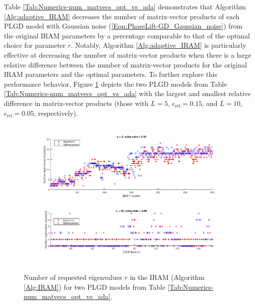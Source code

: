 Table \ref{Tab:Numerics-num_matvecs_opt_vs_ada} demonstrates that Algorithm \ref{Alg:adaptive_IRAM} decreases the number of matrix-vector products of each PLGD model with Gaussian noise (\ref{Eqn:PhaseLift-GD_Gaussian_noise}) from the original IRAM parameters by a percentage comparable to that of the optimal choice for parameter $r$.
Notably, Algorithm \ref{Alg:adaptive_IRAM} is particularly effective at decreasing the number of matrix-vector products when there is a large relative difference between the number of matrix-vector products for the original IRAM parameters and the optimal parameters.
To further explore this performance behavior, Figure \ref{Fig:Numerics-num_eigs_ada_vs_opt} depicts the two PLGD models from Table \ref{Tab:Numerics-num_matvecs_opt_vs_ada} with the largest and smallest relative difference in matrix-vector products (those with $L=5$, $\epsilon_\text{rel} = 0.15$, and $L=10$, $\epsilon_\text{rel} = 0.05$, respectively).



\begin{figure}[H]
\centering
\hbox{\hspace{-1.0cm} \includegraphics[scale=0.6]{Numerics-num_eigs_ada_vs_opt_1} }\vspace{0.6cm}
\hbox{\hspace{-1.0cm} \includegraphics[scale=0.6]{Numerics-num_eigs_ada_vs_opt_2} }
\vspace{0.2cm}
	\caption{
	Number of requested eigenvalues $r$ in the IRAM (Algorithm \ref{Alg:IRAM}) for two PLGD models from Table \ref{Tab:Numerics-num_matvecs_opt_vs_ada}.
	}
\label{Fig:Numerics-num_eigs_ada_vs_opt}
\end{figure}


